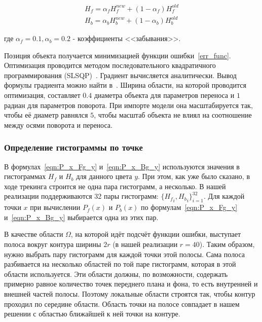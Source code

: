 \begin{equation}
\begin{array}{c}
H_{f} = \alpha_f H_{f}^{new} + (1 - \alpha_f) H_f^{old} \\
H_{b} = \alpha_b H_{b}^{new} + (1 - \alpha_b) H_b^{old}
\end{array}
\end{equation}

где $\alpha_f = 0.1, \alpha_b = 0.2$ - коэффициенты <<забывания>>.

Позиция объекта получается минимизацией функции ошибки~\ref{err_func}.
Оптимизация проводится методом последовательного квадратичного программирования
(SLSQP)~\cite{SLSQP}.
Градиент вычисляется аналитически.
Вывод формулы градиента можно найти в~\cite{Tjaden2018}.
Ширина области, на которой проводится оптимизация, составляет $0.4$ диаметра
объекта для параметров переноса и $1$ радиан для параметров поворота.
При импорте модели она масштабируется так, чтобы её диаметр равнялся $5$, чтобы
масштаб объекта не влиял на соотношение между осями поворота и переноса.



\subsubsection*{Определение гистограммы по точке}
В формулах~\ref{eqn:P_x_Fg_y} и~\ref{eqn:P_x_Bg_y} используются значения в
гистограммах $H_f$ и $H_b$ для данного цвета $y$.
При этом, как уже было сказано, в ходе трекинга строится не одна пара
гистограмм, а несколько.
В нашей реализации поддерживаются 32 пары гистограмм: $\{{H_f}_i, {H_b}_i\}_{i
= 1}^{32}$.
Для каждой точки $x$ при вычислении $P_f(x)$ и $P_b(x)$ по
формулам~\ref{eqn:P_x_Fg_y} и~\ref{eqn:P_x_Bg_y} выбирается одна из этих пар.

В качестве области $\Omega$, на которой идёт подсчёт функции ошибки, выступает
полоса вокруг контура ширины $2r$ (в нашей реализации $r = 40$).
Таким образом, нужно выбрать пару гистограмм для каждой точки этой полосы.
Сама полоса разбивается на несколько областей по той паре гистограмм, которая в
этой области используется.
Эти области должны, по возможности, содержать примерно равное количество точек
переднего плана и фона, то есть внутренней и внешней частей полосы.
Поэтому локальные области строятся так, чтобы контур проходил по середине
области.
Область точки на полосе совпадает в нашем решении с областью ближайшей к ней
точки на контуре.

